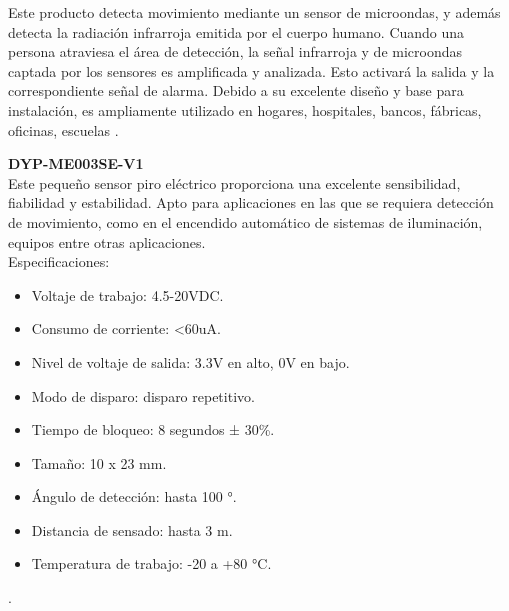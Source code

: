 %

Este producto detecta movimiento mediante un sensor de microondas, y además 
detecta la radiación infrarroja emitida por el cuerpo humano. Cuando una persona 
atraviesa el área de detección, la señal infrarroja y de microondas captada por 
los sensores es amplificada y analizada. Esto activará la salida y la 
correspondiente señal de alarma. Debido a su excelente diseño y base para 
instalación, es ampliamente utilizado en hogares, hospitales, bancos, fábricas, 
oficinas, escuelas 
\cite{sensores:proximidad:piroelectrico:deteccion:movimiento}.
 
\textbf{DYP-ME003SE-V1} \\
Este pequeño sensor piro eléctrico proporciona una excelente sensibilidad, 
fiabilidad y estabilidad. Apto para aplicaciones en las que se requiera 
detección de movimiento, como en el encendido automático de sistemas de 
iluminación, equipos entre otras aplicaciones. \\

Especificaciones:
\begin{itemize}
	\item Voltaje de trabajo: 4.5-20VDC.
	\item Consumo de corriente: <60uA.
	\item Nivel de voltaje de salida: 3.3V en alto, 0V en bajo.
	\item Modo de disparo: disparo repetitivo.
	\item Tiempo de bloqueo: 8 segundos ± 30\%.
	\item Tamaño: 10 x 23 mm.
	\item Ángulo de detección: hasta 100 °.
	\item Distancia de sensado: hasta 3 m.
	\item Temperatura de trabajo: -20 a +80 °C.
\end{itemize}

. \\ \\
